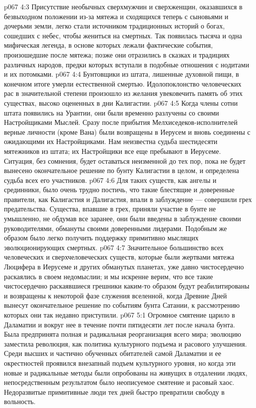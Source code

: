 \vs p067 4:3 Присутствие необычных сверхмужчин и сверхженщин, оказавшихся в безвыходном положении из\hyp{}за мятежа и сходящихся теперь с сыновьями и дочерьми земли, легко стали источником традиционных историй о богах, сошедших с небес, чтобы жениться на смертных. Так появилась тысяча и одна мифическая легенда, в основе которых лежали фактические события, произошедшие после мятежа; позже они отразились в сказках и традициях различных народов, предки которых вступали в подобные отношения с нодитами и их потомками.
\vs p067 4:4 Бунтовщики из штата, лишенные духовной пищи, в конечном итоге умерли естественной смертью. Идолопоклонство человеческих рас в значительной степени произошло из желания увековечить память об этих существах, высоко оцененных в дни Калигастии.
\vs p067 4:5 Когда члены сотни штата появились на Урантии, они были временно разлучены со своими Настройщиками Мыслей. Сразу после прибытия Мелхиседеков\hyp{}исполнителей верные личности (кроме Вана) были возвращены в Иерусем и вновь соединены с ожидающими их Настройщиками. Нам неизвестна судьба шестидесяти мятежников из штата; их Настройщики все еще пребывают в Иерусеме. Ситуация, без сомнения, будет оставаться неизменной до тех пор, пока не будет вынесено окончательное решение по бунту Калигастии в целом, и определена судьба всех его участников.
\vs p067 4:6 \pc Для таких существ, как ангелы и срединники, было очень трудно постичь, что такие блестящие и доверенные правители, как Калигастия и Далигастия, впали в заблуждение --- совершили грех предательства. Существа, впавшие в грех, приняли участие в бунте не умышленно, не обдумав все заранее, они были введены в заблуждение своими руководителями, обмануты своими доверенными лидерами. Подобным же образом было легко получить поддержку примитивно мыслящих эволюционирующих смертных.
\vs p067 4:7 Значительное большинство всех человеческих и сверхчеловеческих существ, которые были жертвами мятежа Люцифера в Иерусеме и других обманутых планетах, уже давно чистосердечно раскаялись в своем недомыслии; и мы искренне верим, что все такие чистосердечно раскаявшиеся грешники каким\hyp{}то образом будут реабилитированы и возвращены к некоторой фазе служения вселенной, когда Древние Дней вынесут окончательное решение по событиям бунта Сатании, к рассмотрению которых они так недавно приступили.
\vs p067 5:1 Огромное смятение царило в Даламатии и вокруг нее в течение почти пятидесяти лет после начала бунта. Была предпринята полная и радикальная реорганизация всего мира; эволюцию заместила революция, как политика культурного подъема и расового улучшения. Среди высших и частично обученных обитателей самой Даламатии и ее окрестностей проявился внезапный подъем культурного уровня, но когда эти новые и радикальные методы были опробованы на живущих в отдалении людях, непосредственным результатом было неописуемое смятение и расовый хаос. Недоразвитые примитивные люди тех дней быстро превратили свободу в вольность.
